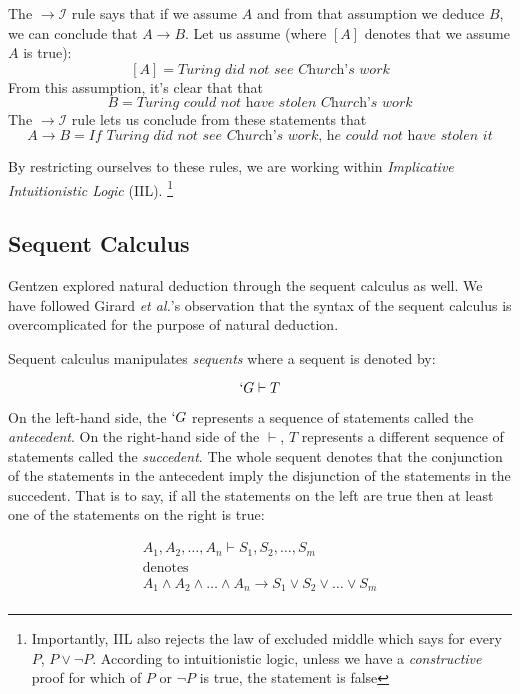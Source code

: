   The $\to\mathcal{I}$ rule says that if we assume $A$ and from that assumption we deduce $B$,
  we can conclude that $A \to B$.
  Let us assume (where $[A]$ denotes that we assume $A$ is true): 
  \[
    [A] = \textit{Turing did not see Church's work} 
  \]
  From this assumption, it's clear that that 
  \[
    B = \textit{Turing could not have stolen Church's work} 
  \]
  The $\to\mathcal{I}$ rule lets us conclude from these statements that
  \[
    A \to B = \textit{If Turing did not see Church's work, he could not have stolen it}
  \]

  By restricting ourselves to these rules, we are working within \emph{Implicative Intuitionistic Logic} (IIL).
  \footnote{Importantly, IIL also rejects the law of excluded middle which says for every $P$, $P \lor \neg P$.
  According to intuitionistic logic, unless we have a \emph{constructive} proof for which of $P$ or $\neg P$ is true, the statement is false}
  
  \subsection{Sequent Calculus}
  
  Gentzen explored natural deduction through the sequent calculus as well. 
  We have followed Girard \emph{et al.}'s observation that the syntax of the sequent calculus is overcomplicated for the purpose of natural deduction.\cite{Girard89}
  
  Sequent calculus manipulates \emph{sequents} where a sequent is denoted by:
  
    \[
      `G \vdash T
    \]
    
  On the left-hand side, the $`G$ represents a sequence of statements called the \emph{antecedent}.
  On the right-hand side of the $\vdash$, $T$ represents a different sequence of statements called the \emph{succedent}.
  The whole sequent denotes that the conjunction of the statements in the antecedent imply the disjunction of the statements in the succedent.
  That is to say, if all the statements on the left are true then at least one of the statements on the right is true:
  
  \[
    \begin{array}{c}
    A_1,A_2,\dots,A_n \vdash S_1,S_2,\dots,S_m \\
      \text{denotes} \\
    A_1 \wedge A_2 \wedge \dots \wedge A_n \to S_1 \lor S_2 \lor \dots \lor S_m \\
    \end{array}
  \]

